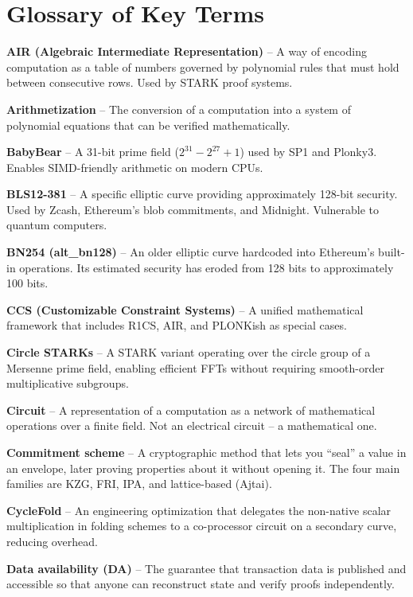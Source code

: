 \documentclass[
  11pt,
  openany]{report}
\renewcommand{\textbf}[1]{{\bfseries\color{MidnightBold}#1}}
\begin{document}
\chapter*{Glossary of Key Terms}\label{glossary-of-key-terms}

\textbf{AIR (Algebraic Intermediate Representation)} -- A way of encoding
computation as a table of numbers governed by polynomial rules that must hold
between consecutive rows. Used by STARK proof systems.

\textbf{Arithmetization} -- The conversion of a computation into a system of
polynomial equations that can be verified mathematically.

\textbf{BabyBear} -- A 31-bit prime field (\(2^{31} - 2^{27} + 1\)) used by SP1
and Plonky3. Enables SIMD-friendly arithmetic on modern CPUs.

\textbf{BLS12-381} -- A specific elliptic curve providing approximately 128-bit
security. Used by Zcash, Ethereum's blob commitments, and Midnight. Vulnerable
to quantum computers.

\textbf{BN254 (alt\_bn128)} -- An older elliptic curve hardcoded into Ethereum's
built-in operations. Its estimated security has eroded from 128 bits to
approximately 100 bits.

\textbf{CCS (Customizable Constraint Systems)} -- A unified mathematical
framework that includes R1CS, AIR, and PLONKish as special cases.

\textbf{Circle STARKs} -- A STARK variant operating over the circle group of a
Mersenne prime field, enabling efficient FFTs without requiring smooth-order
multiplicative subgroups.

\textbf{Circuit} -- A representation of a computation as a network of
mathematical operations over a finite field. Not an electrical circuit -- a
mathematical one.

\textbf{Commitment scheme} -- A cryptographic method that lets you ``seal'' a
value in an envelope, later proving properties about it without opening it. The
four main families are KZG, FRI, IPA, and lattice-based (Ajtai).

\textbf{CycleFold} -- An engineering optimization that delegates the non-native
scalar multiplication in folding schemes to a co-processor circuit on a
secondary curve, reducing overhead.

\textbf{Data availability (DA)} -- The guarantee that transaction data is
published and accessible so that anyone can reconstruct state and verify proofs
independently.
\end{document}
